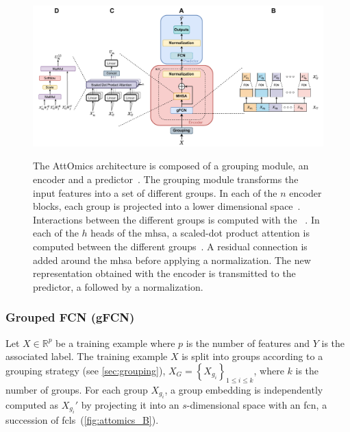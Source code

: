 \documentclass[../main.tex]{subfiles}
\begin{document}
\begin{figure}[htbp]
	\centering
	\begin{subcaptiongroup}
		\includegraphics[width=\textwidth]{Beaude.168.fig.1.pdf}
		\label{fig:attomics_A}
		\label{fig:attomics_B}
		\label{fig:attomics_C}
		\label{fig:attomics_D}
	\end{subcaptiongroup}
	\caption[The AttOmics architecture]{The AttOmics architecture is composed of a grouping module, an encoder and a predictor~. The grouping module transforms the input features into a set of different groups. In each of the $n$ encoder blocks, each group is projected into a lower dimensional space~. Interactions between the different groups is computed with the ~. In each of the $h$ heads of the \gls{mhsa}, a scaled-dot product attention is computed between the different groups~. A residual connection is added around the \gls{mhsa} before applying a normalization. The new representation obtained with the encoder is transmitted to the predictor, a  followed by a normalization.~}\label{fig:attomics_arch}
\end{figure}

\subsubsection{Grouped FCN (gFCN)}
Let $X \in \mathbb{R}^p$ be a training example where $p$ is the number of features and $Y$ is the associated label.
The training example $X$ is split into groups according to a grouping strategy (see \cref{sec:grouping}), $ X_G = \left\{X_{g_i} \right\}_{1 \leq i \leq k}$, where $k$ is the number of groups.
For each group  $X_{g_i}$, a group embedding is independently computed as $X_{g_i}'$ by projecting it into an $s$-dimensional space with an \gls{fcn}, a succession of \glspl{fcl}~(\cref{fig:attomics_B}).
\end{document}
